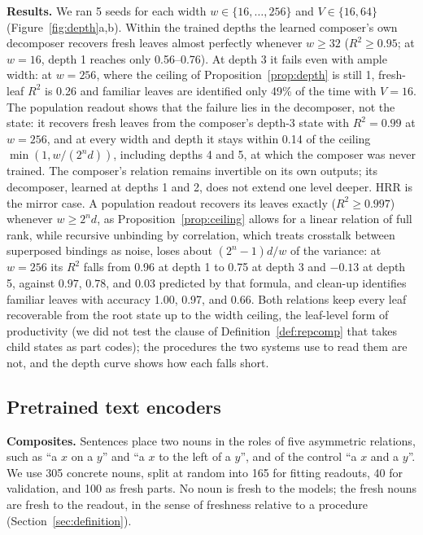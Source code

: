 \documentclass[10pt]{article}
\theoremstyle{plain}
\theoremstyle{remark}
\begin{document}
\textbf{Results.} We ran 5 seeds for each width $w \in \{16, \ldots, 256\}$ and $V \in \{16, 64\}$ (Figure~\ref{fig:depth}a,b). Within the trained depths the learned composer's own decomposer recovers fresh leaves almost perfectly whenever $w \ge 32$ ($R^2 \ge 0.95$; at $w = 16$, depth 1 reaches only 0.56--0.76). At depth 3 it fails even with ample width: at $w = 256$, where the ceiling of Proposition~\ref{prop:depth} is still 1, fresh-leaf $R^2$ is 0.26 and familiar leaves are identified only 49\% of the time with $V = 16$. The population readout shows that the failure lies in the decomposer, not the state: it recovers fresh leaves from the composer's depth-3 state with $R^2 = 0.99$ at $w = 256$, and at every width and depth it stays within 0.14 of the ceiling $\min(1, w/(2^n d))$, including depths 4 and 5, at which the composer was never trained. The composer's relation remains invertible on its own outputs; its decomposer, learned at depths 1 and 2, does not extend one level deeper. HRR is the mirror case. A population readout recovers its leaves exactly ($R^2 \ge 0.997$) whenever $w \ge 2^n d$, as Proposition~\ref{prop:ceiling} allows for a linear relation of full rank, while recursive unbinding by correlation, which treats crosstalk between superposed bindings as noise, loses about $(2^n - 1)d/w$ of the variance: at $w = 256$ its $R^2$ falls from 0.96 at depth 1 to 0.75 at depth 3 and $-0.13$ at depth 5, against $0.97$, $0.78$, and $0.03$ predicted by that formula, and clean-up identifies familiar leaves with accuracy 1.00, 0.97, and 0.66. Both relations keep every leaf recoverable from the root state up to the width ceiling, the leaf-level form of productivity (we did not test the clause of Definition~\ref{def:repcomp} that takes child states as part codes); the procedures the two systems use to read them are not, and the depth curve shows how each falls short.

\subsection{Pretrained text encoders}
\label{sec:pretrained}

\textbf{Composites.} Sentences place two nouns in the roles of five asymmetric relations, such as ``a $x$ on a $y$'' and ``a $x$ to the left of a $y$'', and of the control ``a $x$ and a $y$''. We use 305 concrete nouns, split at random into 165 for fitting readouts, 40 for validation, and 100 as fresh parts. No noun is fresh to the models; the fresh nouns are fresh to the readout, in the sense of freshness relative to a procedure (Section~\ref{sec:definition}).
\end{document}
